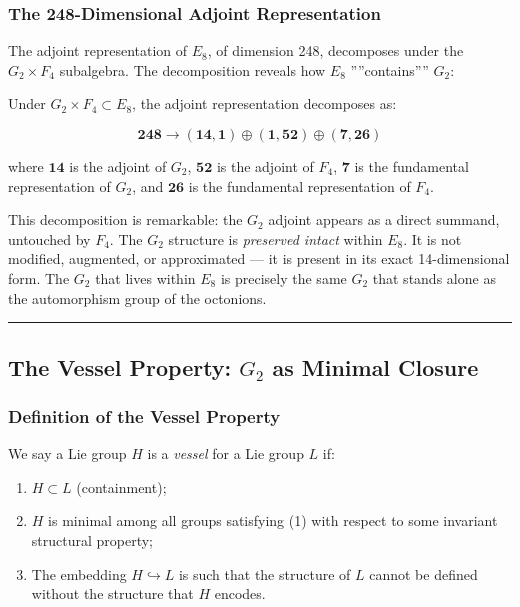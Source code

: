 \documentclass[12pt,a4paper]{article}
\begin{document}
\subsubsection{The 248-Dimensional Adjoint Representation}

The adjoint representation of $E_8$, of dimension 248, decomposes under the $G_2 \times F_4$ subalgebra. The decomposition reveals how $E_8$ ''''contains'''' $G_2$:

Under $G_2 \times F_4 \subset E_8$, the adjoint representation decomposes as:

\[\mathbf{248} \to (\mathbf{14}, \mathbf{1}) \oplus (\mathbf{1}, \mathbf{52}) \oplus (\mathbf{7}, \mathbf{26})\]

where $\mathbf{14}$ is the adjoint of $G_2$, $\mathbf{52}$ is the adjoint of $F_4$, $\mathbf{7}$ is the fundamental representation of $G_2$, and $\mathbf{26}$ is the fundamental representation of $F_4$.

This decomposition is remarkable: the $G_2$ adjoint appears as a direct summand, untouched by $F_4$. The $G_2$ structure is \emph{preserved intact} within $E_8$. It is not modified, augmented, or approximated --- it is present in its exact 14-dimensional form. The $G_2$ that lives within $E_8$ is precisely the same $G_2$ that stands alone as the automorphism group of the octonions.

\begin{center}
\rule{0.5\textwidth}{0.4pt}
\end{center}

\subsection{The Vessel Property: $G_2$ as Minimal Closure}

\subsubsection{Definition of the Vessel Property}

We say a Lie group $H$ is a \emph{vessel} for a Lie group $L$ if:

\begin{enumerate}
    \item $H \subset L$ (containment);
    \item $H$ is minimal among all groups satisfying (1) with respect to some invariant structural property;
    \item The embedding $H \hookrightarrow L$ is such that the structure of $L$ cannot be defined without the structure that $H$ encodes.
\end{enumerate}
\end{document}
